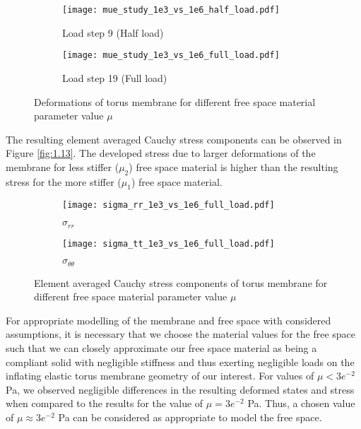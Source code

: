 \begin{figure}[h!]
\centering 
\begin{subfigure}[b]{0.49\textwidth}
\centering
\texttt{[image: mue\_study\_1e3\_vs\_1e6\_half\_load.pdf]}
\caption{Load step 9 (Half load)}
\label{fig:1.12.1}
\end{subfigure}
\begin{subfigure}[b]{0.49\textwidth}
\centering
\texttt{[image: mue\_study\_1e3\_vs\_1e6\_full\_load.pdf]}
\caption{Load step 19 (Full load)}
\label{fig:1.12.2}
\end{subfigure}
\caption{Deformations of torus membrane for different free space material parameter value $\mu$}
\label{fig:1.12}
\end{figure}

The resulting element averaged Cauchy stress components can be observed in Figure \eqref{fig:1.13}. The developed stress due to larger deformations of the membrane for less stiffer ($\mu_2$) free space material is higher than the resulting stress for the more stiffer ($\mu_1$) free space material. \par 

\begin{figure}[h!]
\centering 
\begin{subfigure}[b]{0.49\textwidth}
\centering
\texttt{[image: sigma\_rr\_1e3\_vs\_1e6\_full\_load.pdf]}
\caption{$\sigma_{rr}$}
\label{fig:1.13.1}
\end{subfigure}
\begin{subfigure}[b]{0.49\textwidth}
\centering
\texttt{[image: sigma\_tt\_1e3\_vs\_1e6\_full\_load.pdf]}
\caption{$\sigma_{\theta \theta}$}
\label{fig:1.13.2}
\end{subfigure}
\caption{Element averaged Cauchy stress components of torus membrane for different free space material parameter value $\mu$}
\label{fig:1.13}
\end{figure}

For appropriate modelling of the membrane and free space with considered assumptions, it is necessary that we choose the material values for the free space such that we can closely approximate our free space material as being a compliant solid with negligible stiffness and thus exerting negligible loads on the inflating elastic torus membrane geometry of our interest. For values of $\mu < 3e^{-2}$ Pa, we observed negligible differences in the resulting deformed states and stress when compared to the results for the value of $\mu = 3e^{-2}$ Pa. Thus, a chosen value of $\mu \approx 3e^{-2}$ Pa can be considered as appropriate to model the free space. \par 

